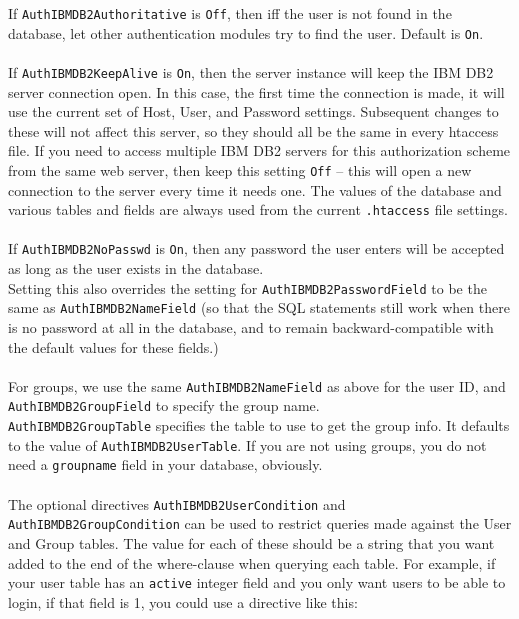 \documentclass[11pt,letterpaper]{article}
\begin{document}
\newpage
\noindent
If {\tt AuthIBMDB2Authoritative} is {\tt Off}, then iff the user is not found in the database, let other authentication modules try to find the user. Default is {\tt On}. \\
\\
If {\tt AuthIBMDB2KeepAlive} is {\tt On}, then the server instance will keep the IBM DB2 server connection open.  In this case, the first time the connection is made, it will use the current set of Host, User, and Password settings.  Subsequent changes to these will not affect this server, so they should all be the same in every htaccess file.
If you need to access multiple IBM DB2 servers for this authorization scheme from the same web server, then keep this setting {\tt Off} -- this will open a new connection to the server every time it needs one.  The values of the database and various tables and fields are always used from the current {\tt .htaccess} file settings.\\
\\
If {\tt AuthIBMDB2NoPasswd} is {\tt On}, then any password the user enters will be accepted as long as the user exists in the database.\\ Setting this also overrides the setting for {\tt AuthIBMDB2PasswordField} to be the same as {\tt AuthIBMDB2NameField} (so that the SQL statements still work when there is no password at all in the database, and to remain backward-compatible with the default values for these fields.)\\
\\
For groups, we use the same {\tt AuthIBMDB2NameField} as above for the user ID, and {\tt AuthIBMDB2GroupField} to specify the group name.\\ {\tt AuthIBMDB2GroupTable} specifies the table to use to get the group info.  It defaults to the value of {\tt AuthIBMDB2UserTable}.  If you are not using groups, you do not need a {\tt groupname} field in your database, obviously.\\
\\
The optional directives {\tt AuthIBMDB2UserCondition} and \\{\tt AuthIBMDB2GroupCondition} can be used to restrict queries made against the User and Group tables. The value for each of these should be a string that you want added to the end of the where-clause when querying each table.
For example, if your user table has an {\tt active} integer field and you only want users to be able to login, if that field is 1, you could use a directive like this:\\
\end{document}
